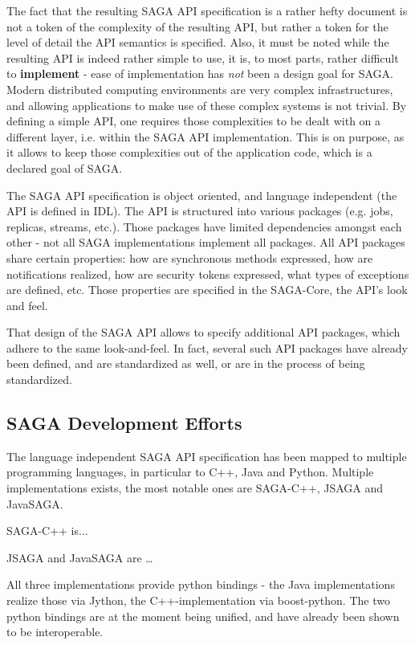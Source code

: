\documentclass[12pt]{article}
\begin{document}
  The fact that the resulting SAGA API specification is a rather hefty
  document is not a token of the complexity of the resulting API, but
  rather a token for the level of detail the API semantics is
  specified.  Also, it must be noted while the resulting API is indeed
  rather simple to use, it is, to most parts, rather difficult to {\bf
  implement} - ease of implementation has {\it not} been a design goal
  for SAGA.  Modern distributed computing environments are very
  complex infrastructures, and allowing applications to make use of
  these complex systems is not trivial.  By defining a simple API, one
  requires those complexities to be dealt with on a different layer,
  i.e. within the SAGA API implementation. This is on purpose, as it
  allows to keep those complexities out of the application code, which
  is a declared goal of SAGA.

  The SAGA API specification is object oriented, and language
  independent (the API is defined in IDL).  The API is structured into
  various packages (e.g. jobs, replicas, streams, etc.).  Those
  packages have limited dependencies amongst each other - not all SAGA
  implementations implement all packages.  All API packages share
  certain properties: how are synchronous methods expressed, how are
  notifications realized, how are security tokens expressed, what
  types of exceptions are defined, etc.  Those properties are
  specified in the SAGA-Core, the API's look and feel.  

  That design of the SAGA API allows to specify additional API
  packages, which adhere to the same look-and-feel.  In fact, several
  such API packages have already been defined, and are standardized as
  well, or are in the process of being standardized.


 \subsection{SAGA Development Efforts}

  The language independent SAGA API specification has been mapped to
  multiple programming languages, in particular to C++, Java and
  Python.  Multiple implementations exists, the  most notable ones are
  SAGA-C++, JSAGA and JavaSAGA.

  SAGA-C++ is...

  JSAGA and JavaSAGA are …

  All three implementations provide python bindings - the Java
  implementations realize those via Jython, the C++-implementation via
  boost-python.  The two python bindings are at the moment being
  unified, and have already been shown to be interoperable.
\end{document}
